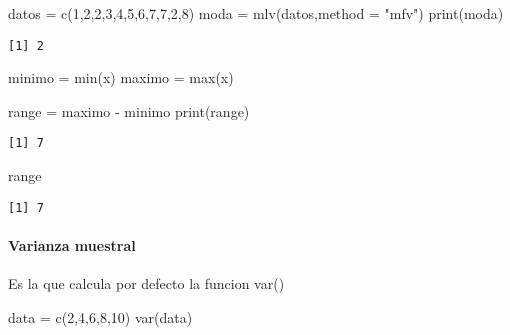 \documentclass[
  letterpaper,
  DIV=11,
  numbers=noendperiod]{scrartcl}
\let\oldparagraph\paragraph
\renewcommand{\paragraph}[1]{\oldparagraph{#1}\mbox{}}
\newenvironment{Shaded}{\begin{snugshade}}{\end{snugshade}}
\newcommand{\AttributeTok}[1]{\textcolor[rgb]{0.40,0.45,0.13}{#1}}
\newcommand{\DecValTok}[1]{\textcolor[rgb]{0.68,0.00,0.00}{#1}}
\newcommand{\FunctionTok}[1]{\textcolor[rgb]{0.28,0.35,0.67}{#1}}
\newcommand{\NormalTok}[1]{\textcolor[rgb]{0.00,0.23,0.31}{#1}}
\newcommand{\OtherTok}[1]{\textcolor[rgb]{0.00,0.23,0.31}{#1}}
\newcommand{\SpecialCharTok}[1]{\textcolor[rgb]{0.37,0.37,0.37}{#1}}
\newcommand{\StringTok}[1]{\textcolor[rgb]{0.13,0.47,0.30}{#1}}
\begin{document}
\begin{Shaded}
\begin{Highlighting}[]
\NormalTok{datos }\OtherTok{=} \FunctionTok{c}\NormalTok{(}\DecValTok{1}\NormalTok{,}\DecValTok{2}\NormalTok{,}\DecValTok{2}\NormalTok{,}\DecValTok{3}\NormalTok{,}\DecValTok{4}\NormalTok{,}\DecValTok{5}\NormalTok{,}\DecValTok{6}\NormalTok{,}\DecValTok{7}\NormalTok{,}\DecValTok{7}\NormalTok{,}\DecValTok{2}\NormalTok{,}\DecValTok{8}\NormalTok{)}
\NormalTok{moda }\OtherTok{=} \FunctionTok{mlv}\NormalTok{(datos,}\AttributeTok{method =} \StringTok{"mfv"}\NormalTok{)}
\FunctionTok{print}\NormalTok{(moda)}
\end{Highlighting}
\end{Shaded}

\begin{verbatim}
[1] 2
\end{verbatim}

\begin{Shaded}
\begin{Highlighting}[]
\NormalTok{minimo }\OtherTok{=} \FunctionTok{min}\NormalTok{(x)}
\NormalTok{maximo }\OtherTok{=} \FunctionTok{max}\NormalTok{(x)}

\NormalTok{range }\OtherTok{=}\NormalTok{ maximo }\SpecialCharTok{{-}}\NormalTok{ minimo}
\FunctionTok{print}\NormalTok{(range)}
\end{Highlighting}
\end{Shaded}

\begin{verbatim}
[1] 7
\end{verbatim}

\begin{Shaded}
\begin{Highlighting}[]
\NormalTok{range}
\end{Highlighting}
\end{Shaded}

\begin{verbatim}
[1] 7
\end{verbatim}

\paragraph{Varianza muestral}\label{varianza-muestral}

Es la que calcula por defecto la funcion var()

\begin{Shaded}
\begin{Highlighting}[]
\NormalTok{data }\OtherTok{=} \FunctionTok{c}\NormalTok{(}\DecValTok{2}\NormalTok{,}\DecValTok{4}\NormalTok{,}\DecValTok{6}\NormalTok{,}\DecValTok{8}\NormalTok{,}\DecValTok{10}\NormalTok{)}
\FunctionTok{var}\NormalTok{(data)}
\end{Highlighting}
\end{Shaded}
\end{document}
